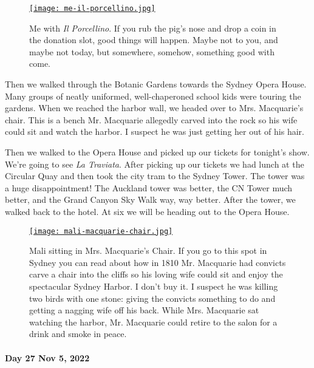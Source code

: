 \captionsetup[figure]{labelformat=empty}
\begin{SCfigure}
 \centering
\href{https://conceptcontrol.smugmug.com/Trips/Overseas/Australia-New-Zealand-2022/i-kKGfSRz/A}{\texttt{[image: me-il-porcellino.jpg]}}
\caption[Me with \emph{Il Porcellino}]{Me with \emph{Il Porcellino}. If you rub the pig's nose and
drop a coin in the donation slot, good things will happen. Maybe not to
you, and maybe not today, but somewhere, somehow, something good with
come.}
\label{fig:7627x1}
\end{SCfigure}
 

Then we walked through the Botanic Gardens towards the Sydney Opera
House. Many groups of neatly uniformed, well-chaperoned school kids were
touring the gardens. When we reached the harbor wall, we headed over to
Mrs. Macquarie's chair. This is a bench Mr. Macquarie allegedly carved
into the rock so his wife could sit and watch the harbor. I suspect he
was just getting her out of his hair.

Then we walked to the Opera House and picked up our tickets for
tonight's show. We're going to see \emph{La Traviata}. After picking up
our tickets we had lunch at the Circular Quay and then took the city
tram to the Sydney Tower. The tower was a huge disappointment! The
Auckland tower was better, the CN Tower much better, and the Grand
Canyon Sky Walk way, way better. After the tower, we walked back to the
hotel. At six we will be heading out to the Opera House.


\captionsetup[figure]{labelformat=empty}
\begin{SCfigure}[20]
 \centering
\href{https://conceptcontrol.smugmug.com/Trips/Overseas/Australia-New-Zealand-2022/i-S2hzjsV/A}{\texttt{[image: mali-macquarie-chair.jpg]}}
\caption[Mali sitting in Mrs. Macquarie's Chair]{Mali sitting in Mrs. Macquarie's Chair. If you go to this spot
in Sydney you can read about how in 1810 Mr. Macquarie had convicts
carve a chair into the cliffs so his loving wife could sit and enjoy the
spectacular Sydney Harbor. I don't buy it. I suspect he was killing two
birds with one stone: giving the convicts something to do and getting a
nagging wife off his back. While Mrs. Macquarie sat watching the harbor,
Mr. Macquarie could retire to the salon for a drink and smoke in peace.}
\label{fig:7627x2}
\end{SCfigure}

\hypertarget{day-27-nov-5-2022-fullerton-hotel-lobby-sydney-iphone}{%
\paragraph{\texorpdfstring{\textbf{Day 27 Nov 5, 2022}}{Day 27 Nov 5, 2022}}\label{day-27-nov-5-2022-fullerton-hotel-lobby-sydney-iphone}}

